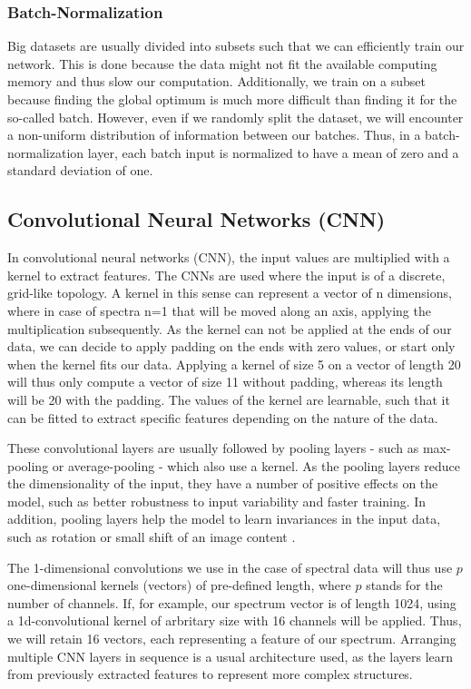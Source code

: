 \subsubsection{Batch-Normalization}
Big datasets are usually divided into subsets such that we can efficiently train our network. This is done because the data might not fit the available computing memory and thus slow our computation. Additionally, we train on a subset because finding the global optimum is much more difficult than finding it for the so-called batch. However, even if we randomly split the dataset, we will encounter a non-uniform distribution of information between our batches. Thus, in a batch-normalization layer, each batch input is normalized to have a mean of zero and a standard deviation of one. 

\subsection{Convolutional Neural Networks (CNN)}
In convolutional neural networks (CNN), the input values are multiplied with a kernel to extract features. The CNNs are used where the input is of a discrete, grid-like topology. A kernel in this sense can represent a vector of n dimensions, where in case of spectra n=1 that will be moved along an axis, applying the multiplication subsequently. As the kernel can not be applied at the ends of our data, we can decide to apply padding on the ends with zero values, or start only when the kernel fits our data. Applying a kernel of size 5 on a vector of length 20 will thus only compute a vector of size 11 without padding, whereas its length will be 20 with the padding.
The values of the kernel are learnable, such that it can be fitted to extract specific features depending on the nature of the data.

These convolutional layers are usually followed by pooling layers - such as max-pooling or average-pooling - which also use a kernel. As the pooling layers reduce the dimensionality of the input, they have a number of positive effects on the model, such as better robustness to input variability and faster training. In addition, pooling layers help the model to learn invariances in the input data, such as rotation or small shift of an image content \cite{goodfellow_deep_2016}. 

The 1-dimensional convolutions we use in the case of spectral data will thus use $p$ one-dimensional kernels (vectors) of pre-defined length, where $p$ stands for the number of channels. If, for example, our spectrum vector is of length 1024, using a 1d-convolutional kernel of arbritary size with 16 channels will be applied. Thus, we will retain 16 vectors, each representing a feature of our spectrum. Arranging multiple CNN layers in sequence is a usual architecture used, as the layers learn from previously extracted features to represent more complex structures.

